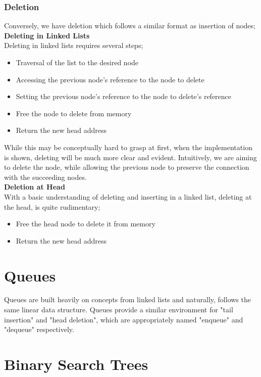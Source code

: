 \documentclass[hidelinks,11pt]{article}
\begin{document}
\subsubsection{Deletion}
Conversely, we have deletion which follows a similar format as insertion of nodes;\\[0.5\baselineskip]
\textbf{Deleting in Linked Lists}\\
Deleting in linked lists requires several steps;
\begin{itemize}
    \item Traversal of the list to the desired node
    \item Accessing the previous node's reference to the node to delete
    \item Setting the previous node's reference to the node to delete's reference 
    \item Free the node to delete from memory
    \item Return the new head address
\end{itemize}
While this may be conceptually hard to grasp at first, when the implementation is shown, deleting will be much more clear and evident. Intuitively, we are aiming to delete the node, while allowing the previous node to preserve the connection with the succeeding nodes.\\[0.5\baselineskip]
\textbf{Deletion at Head}\\
With a basic understanding of deleting and inserting in a linked list, deleting at the head, is quite rudimentary;
\begin{itemize}
    \item Free the head node to delete it from memory
    \item Return the new head address
\end{itemize}

\section{Queues}
Queues are built heavily on concepts from linked lists and naturally, follows the same linear data structure. Queues provide a similar environment for "tail insertion" and "head deletion", which are appropriately named "enqueue" and "dequeue" respectively.
\section{Binary Search Trees}
\end{document}
